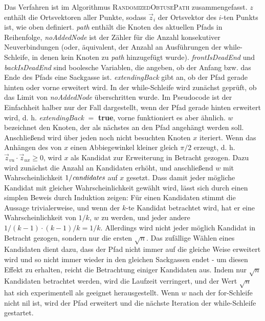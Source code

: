 \documentclass[a4paper, 10pt, ngerman]{article}
\begin{document}
Das Verfahren ist im Algorithmus \textsc{RandomizedObtusePath} zusammengefasst. $z$ enthält die Ortsvektoren aller Punkte, sodass $\vec z_i$ der Ortsvektor des $i$-ten Punkts ist, wie oben definiert. \emph{path} enthält die Knoten des aktuellen Pfads in Reihenfolge, \emph{noAddedNode} ist der Zähler für die Anzahl konsekutiver Neuverbindungen (oder, äquivalent, der Anzahl an Ausführungen der while-Schleife, in denen kein Knoten zu \emph{path} hinzugefügt wurde). \emph{frontIsDeadEnd} und \emph{backIsDeadEnd} sind boolesche Variablen, die angeben, ob der Anfang bzw. das Ende des Pfads eine Sackgasse ist. \emph{extendingBack} gibt an, ob der Pfad gerade hinten oder vorne erweitert wird. In der while-Schleife wird zunächst geprüft, ob das Limit von \emph{noAddedNode} überschritten wurde. Im Pseudocode ist der Einfachheit halber nur der Fall dargestellt, wenn der Pfad gerade hinten erweitert wird, d. h. \emph{extendingBack} $=$ \textbf{true}, vorne funktioniert es aber ähnlich. $w$ bezeichnet den Knoten, der als nächstes an den Pfad angehängt werden soll. Anschließend wird über jeden noch nicht besuchten Knoten $x$ iteriert. Wenn das Anhängen des von $x$ einen Abbiegewinkel kleiner gleich $\pi / 2$ erzeugt, d. h. $\vec z_{vu} \cdot \vec z_{ux} \ge 0$, wird $x$ als Kandidat zur Erweiterung in Betracht gezogen. Dazu wird zunächst die Anzahl an Kandidaten erhöht, und anschließend $w$ mit Wahrscheinlichkeit $1 / \emph{candidates}$ auf $x$ gesetzt. Dass damit jeder mögliche Kandidat mit gleicher Wahrscheinlichkeit gewählt wird, lässt sich durch einen simplen Beweis durch Induktion zeigen: Für einen Kandidaten stimmt die Aussage trivialerweise, und wenn der $k$-te Kandidat betrachtet wird, hat er eine Wahrscheinlichkeit von $1/k$, $w$ zu werden, und jeder andere $1/(k-1) \cdot (k - 1) / k = 1 / k$. Allerdings wird nicht jeder möglich Kandidat in Betracht gezogen, sondern nur die ersten $\sqrt n$. Das zufällige Wählen eines Kandidaten dient dazu, dass der Pfad nicht immer auf die gleiche Weise erweitert wird und so nicht immer wieder in den gleichen Sackgassen endet - um diesen Effekt zu erhalten, reicht die Betrachtung einiger Kandidaten aus. Indem nur $\sqrt n$ Kandidaten betrachtet werden, wird die Laufzeit verringert, und der Wert $\sqrt n$ hat sich experimentell als geeignet herausgestellt. Wenn $w$ nach der for-Schleife nicht nil ist, wird der Pfad erweitert und die nächste Iteration der while-Schleife gestartet. 
\end{document}
